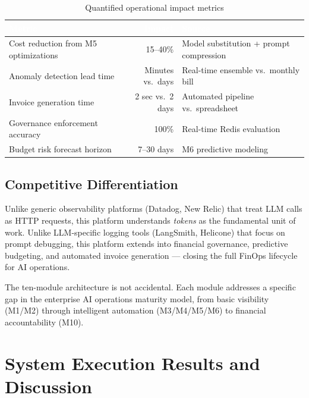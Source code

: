 \documentclass[12pt,a4paper,twoside]{report}
\begin{document}
\begin{table}[H]
\centering
\begin{tabular}{|l|r|l|}
\hline
\rowcolor{tabheader}
\textcolor{white}{\textbf{Metric}} &
\textcolor{white}{\textbf{Impact}} &
\textcolor{white}{\textbf{Source}} \\
\hline
Cost reduction from M5 optimizations & 15--40\% & Model substitution + prompt compression \\
\hline
Anomaly detection lead time & Minutes vs.\ days & Real-time ensemble vs.\ monthly bill \\
\hline
Invoice generation time & 2 sec vs.\ 2 days & Automated pipeline vs.\ spreadsheet \\
\hline
Governance enforcement accuracy & 100\% & Real-time Redis evaluation \\
\hline
Budget risk forecast horizon & 7--30 days & M6 predictive modeling \\
\hline
\end{tabular}
\caption{Quantified operational impact metrics}
\end{table}

\section{Competitive Differentiation}

Unlike generic observability platforms (Datadog, New Relic) that treat LLM calls as HTTP requests, this platform understands \textit{tokens} as the fundamental unit of work. Unlike LLM-specific logging tools (LangSmith, Helicone) that focus on prompt debugging, this platform extends into financial governance, predictive budgeting, and automated invoice generation — closing the full FinOps lifecycle for AI operations.

The ten-module architecture is not accidental. Each module addresses a specific gap in the enterprise AI operations maturity model, from basic visibility (M1/M2) through intelligent automation (M3/M4/M5/M6) to financial accountability (M10).



\chapter{System Execution Results and Discussion}
\end{document}
